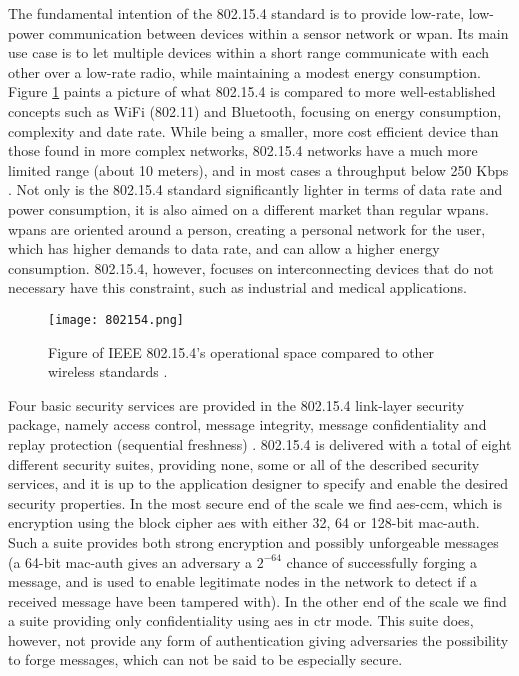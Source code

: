 
The fundamental intention of the 802.15.4 standard is to provide low-rate, low-power communication between devices within a sensor network or \gls{wpan}. Its main use case is to let multiple devices within a short range communicate with each other over a low-rate radio, while maintaining a modest energy consumption. Figure \ref{fig:802154-figure} paints a picture of what 802.15.4 is compared to more well-established concepts such as WiFi (802.11) and Bluetooth, focusing on energy consumption, complexity and date rate. While being a smaller, more cost efficient device than those found in more complex networks, 802.15.4 networks have a much more limited range (about 10 meters), and in most cases a throughput below 250 Kbps \cite{gutierrez2001ieee}. Not only is the 802.15.4 standard significantly lighter in terms of data rate and power consumption, it is also aimed on a different market than regular \gls{wpan}s. \gls{wpan}s are oriented around a person, creating a personal network for the user, which has higher demands to data rate, and can allow a higher energy consumption. 802.15.4, however, focuses on interconnecting devices that do not necessary have this constraint, such as industrial and medical applications. 


\begin{figure}[h]
	\centering
	\texttt{[image: 802154.png]}
	\caption{Figure of IEEE 802.15.4's operational space compared to other wireless standards \cite{gutierrez2001ieee}.}
	\label{fig:802154-figure}
\end{figure}

Four basic security services are provided in the 802.15.4 link-layer security package, namely access control, message integrity, message confidentiality and replay protection (sequential freshness) \cite{sastry2004security}. 802.15.4 is delivered with a total of eight different security suites, providing none, some or all of the described security services, and it is up to the application designer to specify and enable the desired security properties. In the most secure end of the scale we find \gls{aes}-\gls{ccm}, which is encryption using the block cipher \gls{aes} with either 32, 64 or 128-bit \gls{mac-auth}. Such a suite provides both strong encryption and possibly unforgeable messages (a 64-bit \gls{mac-auth} gives an adversary a $2^{-64}$ chance of successfully forging a message, and is used to enable legitimate nodes in the network to detect if a received message have been tampered with). In the other end of the scale we find a suite providing only confidentiality using \gls{aes} in \gls{ctr} mode. This suite does, however, not provide any form of authentication giving adversaries the possibility to forge messages, which can not be said to be especially secure.


